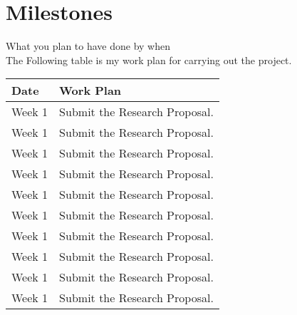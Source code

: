 \section{Milestones}
What you plan to have done by when\\
The Following table is my work plan for carrying out the project.
\begin{center}
	\begin{tabular}{ | l |p{5cm} |}
		\hline
		Date & Work Plan \\ \hline
		Week 1 & Submit the Research Proposal.\\\hline
		Week 1 & Submit the Research Proposal.\\\hline
		Week 1 & Submit the Research Proposal.\\\hline
		Week 1 & Submit the Research Proposal.\\\hline
		Week 1 & Submit the Research Proposal.\\\hline
		Week 1 & Submit the Research Proposal.\\\hline
		Week 1 & Submit the Research Proposal.\\\hline
		Week 1 & Submit the Research Proposal.\\\hline
		Week 1 & Submit the Research Proposal.\\\hline
		Week 1 & Submit the Research Proposal.\\\hline
	\end{tabular}
\end{center}










